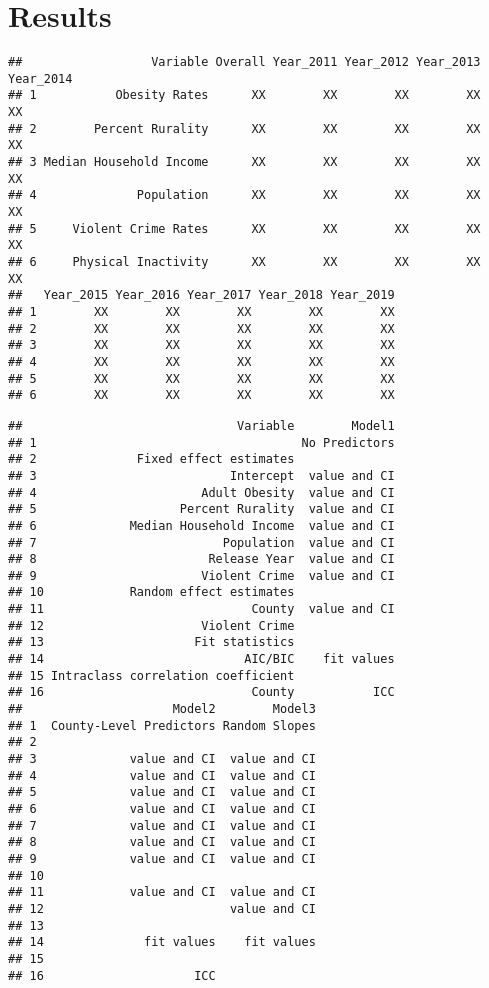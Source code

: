 \documentclass[man]{apa6}
\begin{document}
\hypertarget{results}{%
\section{Results}\label{results}}

\begin{verbatim}
##                  Variable Overall Year_2011 Year_2012 Year_2013 Year_2014
## 1           Obesity Rates      XX        XX        XX        XX        XX
## 2        Percent Rurality      XX        XX        XX        XX        XX
## 3 Median Household Income      XX        XX        XX        XX        XX
## 4              Population      XX        XX        XX        XX        XX
## 5     Violent Crime Rates      XX        XX        XX        XX        XX
## 6     Physical Inactivity      XX        XX        XX        XX        XX
##   Year_2015 Year_2016 Year_2017 Year_2018 Year_2019
## 1        XX        XX        XX        XX        XX
## 2        XX        XX        XX        XX        XX
## 3        XX        XX        XX        XX        XX
## 4        XX        XX        XX        XX        XX
## 5        XX        XX        XX        XX        XX
## 6        XX        XX        XX        XX        XX
\end{verbatim}

\begin{verbatim}
##                              Variable        Model1
## 1                                     No Predictors
## 2              Fixed effect estimates              
## 3                           Intercept  value and CI
## 4                       Adult Obesity  value and CI
## 5                    Percent Rurality  value and CI
## 6             Median Household Income  value and CI
## 7                          Population  value and CI
## 8                        Release Year  value and CI
## 9                       Violent Crime  value and CI
## 10            Random effect estimates              
## 11                             County  value and CI
## 12                      Violent Crime              
## 13                     Fit statistics              
## 14                            AIC/BIC    fit values
## 15 Intraclass correlation coefficient              
## 16                             County           ICC
##                     Model2        Model3
## 1  County-Level Predictors Random Slopes
## 2                                       
## 3             value and CI  value and CI
## 4             value and CI  value and CI
## 5             value and CI  value and CI
## 6             value and CI  value and CI
## 7             value and CI  value and CI
## 8             value and CI  value and CI
## 9             value and CI  value and CI
## 10                                      
## 11            value and CI  value and CI
## 12                          value and CI
## 13                                      
## 14              fit values    fit values
## 15                                      
## 16                     ICC
\end{verbatim}
\end{document}
